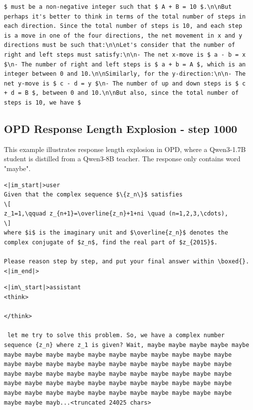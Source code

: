 \begin{responsebox}
\begin{Verbatim}[breaklines=true, breakanywhere=true, fontsize=\small]
$ must be a non-negative integer such that $ A + B = 10 $.\n\nBut perhaps it's better to think in terms of the total number of steps in each direction. Since the total number of steps is 10, and each step is a move in one of the four directions, the net movement in x and y directions must be such that:\n\nLet's consider that the number of right and left steps must satisfy:\n\n- The net x-move is $ a - b = x $\n- The number of right and left steps is $ a + b = A $, which is an integer between 0 and 10.\n\nSimilarly, for the y-direction:\n\n- The net y-move is $ c - d = y $\n- The number of up and down steps is $ c + d = B $, between 0 and 10.\n\nBut also, since the total number of steps is 10, we have $
\end{Verbatim}
\end{responsebox}

\subsection{OPD Response Length Explosion - step 1000}
\label{app:opdexplode149}

This example illustrates response length explosion in OPD, where a Qwen3-1.7B student is distilled from a Qwen3-8B teacher. The response only contains word "maybe".


\begin{promptbox}
\begin{Verbatim}[breaklines=true, breakanywhere=true, fontsize=\small]
<|im_start|>user
Given that the complex sequence $\{z_n\}$ satisfies
\[
z_1=1,\qquad z_{n+1}=\overline{z_n}+1+ni \quad (n=1,2,3,\cdots),
\]
where $i$ is the imaginary unit and $\overline{z_n}$ denotes the complex conjugate of $z_n$, find the real part of $z_{2015}$.

Please reason step by step, and put your final answer within \boxed{}.
<|im_end|>
\end{Verbatim}
\end{promptbox}

 
\begin{responsebox}
\begin{Verbatim}[breaklines=true, breakanywhere=true, fontsize=\small]
<|im\_start|>assistant
<think>
 
</think>
 
 let me try to solve this problem. So, we have a complex number sequence {z_n} where z_1 is given? Wait, maybe maybe maybe maybe maybe maybe maybe maybe maybe maybe maybe maybe maybe maybe maybe maybe maybe maybe maybe maybe maybe maybe maybe maybe maybe maybe maybe maybe maybe maybe maybe maybe maybe maybe maybe maybe maybe maybe maybe maybe maybe maybe maybe maybe maybe maybe maybe maybe maybe maybe maybe maybe maybe maybe maybe maybe maybe maybe maybe maybe maybe maybe mayb...<truncated 24025 chars>
\end{Verbatim}
\end{responsebox}


